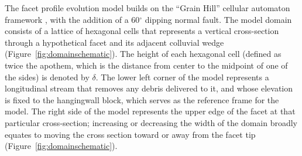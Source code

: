 The facet profile evolution model builds on the ``Grain Hill'' cellular automaton framework \citep{tucker2018lattice}, with the addition of a 60$^\circ$ dipping normal fault. The model domain consists of a lattice of hexagonal cells that represents a vertical cross-section through a hypothetical facet and its adjacent colluvial wedge (Figure~\ref{fig:domainschematic}). The height of each hexagonal cell (defined as twice the apothem, which is the distance from center to the midpoint of one of the sides) is denoted by $\delta$. The lower left corner of the model represents a longitudinal stream that removes any debris delivered to it, and whose elevation is fixed to the hangingwall block, which serves as the reference frame for the model. The right side of the model represents the upper edge of the facet at that particular cross-section; increasing or decreasing the width of the domain broadly equates to moving the cross section toward or away from the facet tip (Figure~\ref{fig:domainschematic}).

